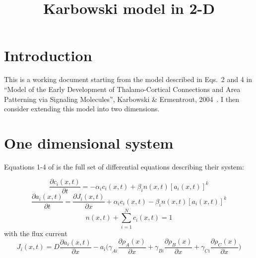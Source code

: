 \documentclass[11pt, a4paper]{article}
\title {
  Karbowski model in 2-D
}
\date{} %
\author{\Authors}
\begin{document}
\setlength{\droptitle}{-1.8cm} %
\maketitle

\vspace{-1.8cm} %

\section{Introduction}

This is a working document starting from the model described in Eqs.~2
and 4 in ``Model of the Early Development of Thalamo-Cortical
Connections and Area Patterning via Signaling Molecules'',
Karbowski \& Ermentrout, 2004~\cite{karbowski_model_2004}. I then
consider extending this model into two dimensions.

\section{One dimensional system}

Equations 1-4 of \cite{karbowski_model_2004} is the full set of
differential equations describing their system:

\begin{equation} \label{eq:Karb1D_dc}
\frac{\partial c_i(x, t)}{\partial t} = -\alpha_i c_i(x, t) + \beta_i
n(x, t)[a_i(x, t)]^k
\end{equation}
%
\begin{equation} \label{eq:Karb1D_da}
\frac{\partial a_i(x, t)}{\partial t} = \frac{\partial J_i(x, t)}{\partial
x} + \alpha_i c_i(x, t) - \beta_i n(x, t)[a_i(x, t)]^k
\end{equation}
%
\begin{equation} \label{eq:Karb1D_conserve}
n(x, t) + \sum_{i=1}^{N} c_i(x, t) = 1
\end{equation}
%
with the flux current
%
\begin{equation} \label{eq:Karb1D_J}
J_i(x, t) = D \frac{\partial a_i(x, t)}{\partial x} - a_i
\bigg(\gamma_{Ai} \frac{\partial \rho_A(x)}{\partial x} +\gamma_{Bi} \frac{\partial \rho_B(x)}{\partial x} + \gamma_{Ci} \frac{\partial \rho_C(x)}{\partial x} \bigg)
\end{equation}
\end{document}
